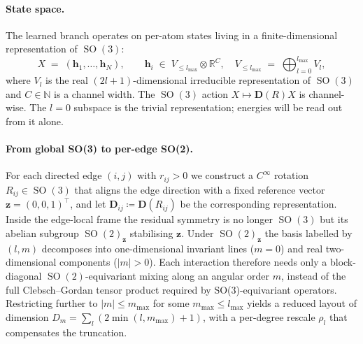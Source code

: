 \documentclass[11pt,a4paper]{article}
\DeclareMathOperator{\SO}{SO}
\newcommand{\R}{\mathbb{R}}
\newcommand{\N}{\mathbb{N}}
\newcommand{\bz}{\bm{z}}
\newcommand{\bh}{\bm{h}}
\newcommand{\bD}{\bm{D}}
\newcommand{\lmax}{l_{\max}}
\newcommand{\mmax}{m_{\max}}
\theoremstyle{plain}
\theoremstyle{definition}
\theoremstyle{remark}
\begin{document}
\paragraph{State space.}
The learned branch operates on per-atom states living in a finite-dimensional
representation of $\SO(3)$:
\begin{equation}\label{eq:overview-state}
    X\;=\;(\bh_1,\dots,\bh_N),\qquad
    \bh_i \;\in\; V_{\le\lmax}\otimes\R^{C},
    \quad
    V_{\le\lmax}\;=\;\bigoplus_{l=0}^{\lmax}V_l,
\end{equation}
where $V_l$ is the real $(2l+1)$-dimensional irreducible representation of $\SO(3)$ and $C\in\N$ is a channel width.
The $\SO(3)$ action $X\mapsto\bD(R)X$ is channel-wise.
The $l=0$ subspace is the trivial representation; energies will be read out from it alone.

\paragraph{From global SO(3) to per-edge SO(2).}
For each directed edge $(i,j)$ with $r_{ij}>0$ we construct a $C^\infty$
rotation $R_{ij}\in\SO(3)$ that aligns the edge direction with a fixed
reference vector $\bz=(0,0,1)^\top$, and let $\bD_{ij}\coloneqq\bD(R_{ij})$ be
the corresponding representation. Inside the edge-local frame the residual
symmetry is no longer $\SO(3)$ but its abelian subgroup $\SO(2)_{\bz}$
stabilising $\bz$. Under $\SO(2)_{\bz}$ the basis labelled by $(l,m)$
decomposes into one-dimensional invariant lines ($m=0$) and real
two-dimensional components ($|m|>0$). Each interaction therefore needs only a
block-diagonal $\SO(2)$-equivariant mixing along an angular order $m$, instead
of the full Clebsch--Gordan tensor product required by SO(3)-equivariant
operators. Restricting further to $|m|\leq\mmax$ for some $\mmax\leq\lmax$
yields a reduced layout of dimension $D_m=\sum_l(2\min(l,\mmax)+1)$, with a
per-degree rescale $\rho_l$ that compensates the truncation.
\end{document}
